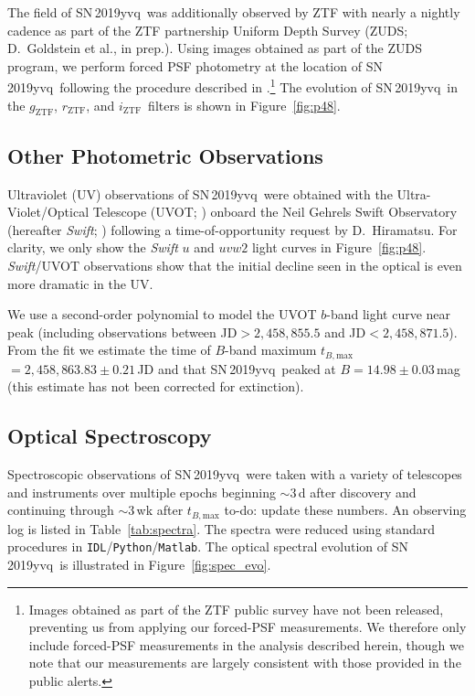 \documentclass[twocolumn]{aastex63}
\newcommand{\todo}[1]{{\color{magenta} to-do: {#1}}}
\newcommand{\rztf}{$r_\mathrm{ZTF}$}
\newcommand{\gztf}{$g_\mathrm{ZTF}$}
\newcommand{\iztf}{$i_\mathrm{ZTF}$}
\newcommand{\tbmax}{$t_{B,\mathrm{max}}$}
\newcommand{\sn}{SN\,2019yvq}
\begin{document}
The field of \sn\ was additionally observed by ZTF with nearly a nightly
cadence as part of the ZTF partnership Uniform Depth Survey (ZUDS;
D.~Goldstein et al., in prep.). Using images obtained as part of the ZUDS
program, we perform forced PSF photometry at the location of \sn\ following
the procedure described in \citet{Yao19}.\footnote{Images obtained as part of
the ZTF public survey have not been released, preventing us from applying our
forced-PSF measurements. We therefore only include forced-PSF measurements in
the analysis described herein, though we note that our measurements are
largely consistent with those provided in the public alerts.} The evolution
of \sn\ in the \gztf, \rztf, and \iztf\ filters is shown in
Figure~\ref{fig:p48}.

\subsection{Other Photometric Observations}

Ultraviolet (UV) observations of \sn\ were obtained with the
Ultra-Violet/Optical Telescope (UVOT; \citet{Roming05}) onboard the Neil
Gehrels Swift Observatory (hereafter \textit{Swift}; \citealt{Gehrels04})
following a time-of-opportunity request by D.~Hiramatsu. For clarity, we only
show the \textit{Swift} $u$ and $uvw2$ light curves in Figure~\ref{fig:p48}.
\textit{Swift}/UVOT observations show that the initial decline seen in the
optical is even more dramatic in the UV.

We use a second-order polynomial to model the UVOT $b$-band light curve near
peak (including observations between JD$> 2,458,855.5$ and JD$<
2,458,871.5$). From the fit we estimate the time of $B$-band maximum \tbmax$
= 2,458,863.83 \pm 0.21$\,JD and that \sn\ peaked at $B = 14.98 \pm
0.03$\,mag (this estimate has not been corrected for extinction).

\subsection{Optical Spectroscopy}

Spectroscopic observations of \sn\ were taken with a variety of telescopes
and instruments over multiple epochs beginning $\sim$3\,d after discovery and
continuing through $\sim$3\,wk after \tbmax \todo{update these numbers}. An
observing log is listed in Table~\ref{tab:spectra}. The spectra were reduced
using standard procedures in \texttt{IDL}/\texttt{Python}/\texttt{Matlab}.
The optical spectral evolution of \sn\ is illustrated in
Figure~\ref{fig:spec_evo}.
\end{document}
